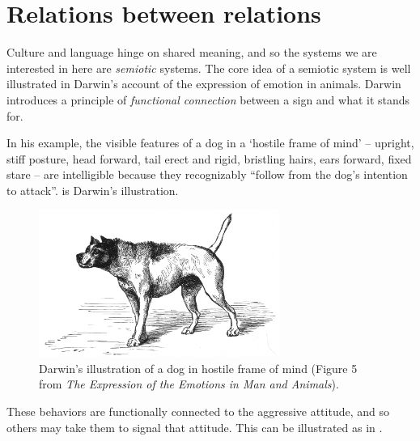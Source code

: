 

\section{Relations between relations}

Culture and language hinge on shared meaning, and so the systems we are interested in here are \textit{semiotic }systems. The core idea of a semiotic system 
is well illustrated in Darwin's account of the expression of emotion in 
animals. Darwin introduces a principle of \textit{functional connection 
}between a sign and what it stands for. 



In his example, the visible features of a dog in a \textquoteleft hostile frame of 
mind' -- upright, stiff posture, head forward, tail erect and rigid, 
bristling hairs, ears forward, fixed stare -- are intelligible because they 
recognizably ``follow from the dog's intention to attack''.  is 
Darwin's illustration.


\begin{figure}[p]
\includegraphics[width=0.70\textwidth,keepaspectratio]{figures/Fig01}
\caption{Darwin's illustration of a dog in hostile frame of mind 
(Figure 5 from \textit{The Expression of the Emotions in Man and 
Animals}).}
\label{darwin1}
\end{figure}



These behaviors are functionally connected to the aggressive attitude, 
and so others may take them to signal that attitude. This can be illustrated as in  .

